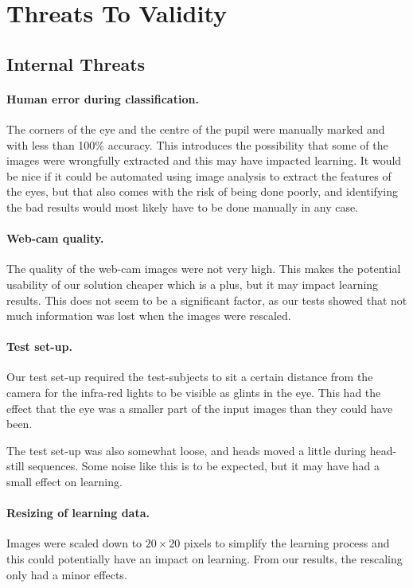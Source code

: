 \section{Threats To Validity}
\subsection{Internal Threats}
\paragraph{Human error during classification.}
The corners of the eye and the centre of the pupil were manually marked and with less than 100\% accuracy.
This introduces the possibility that some of the images were wrongfully extracted and this may have impacted learning.
It would be nice if it could be automated using image analysis to extract the features of the eyes, but that also comes with the risk of being done poorly, and identifying the bad results would most likely have to be done manually in any case.

\paragraph{Web-cam quality.}
The quality of the web-cam images were not very high.
This makes the potential usability of our solution cheaper which is a plus, but it may impact learning results.
This does not seem to be a significant factor, as our tests showed that not much information was lost when the images were rescaled.

\paragraph{Test set-up.}
Our test set-up required the test-subjects to sit a certain distance from the camera for the infra-red lights to be visible as glints in the eye.
This had the effect that the eye was a smaller part of the input images than they could have been.

The test set-up was also somewhat loose, and heads moved a little during head-still sequences.
Some noise like this is to be expected, but it may have had a small effect on learning.

\paragraph{Resizing of learning data.}
Images were scaled down to $20\times 20$ pixels to simplify the learning process and this could potentially have an impact on learning.
From our results, the rescaling only had a minor effects.

